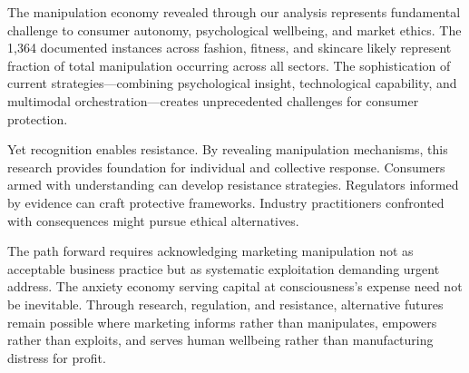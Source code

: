The manipulation economy revealed through our analysis represents fundamental challenge to consumer autonomy, psychological wellbeing, and market ethics. The 1,364 documented instances across fashion, fitness, and skincare likely represent fraction of total manipulation occurring across all sectors. The sophistication of current strategies—combining psychological insight, technological capability, and multimodal orchestration—creates unprecedented challenges for consumer protection.

Yet recognition enables resistance. By revealing manipulation mechanisms, this research provides foundation for individual and collective response. Consumers armed with understanding can develop resistance strategies. Regulators informed by evidence can craft protective frameworks. Industry practitioners confronted with consequences might pursue ethical alternatives.

The path forward requires acknowledging marketing manipulation not as acceptable business practice but as systematic exploitation demanding urgent address. The anxiety economy serving capital at consciousness's expense need not be inevitable. Through research, regulation, and resistance, alternative futures remain possible where marketing informs rather than manipulates, empowers rather than exploits, and serves human wellbeing rather than manufacturing distress for profit.